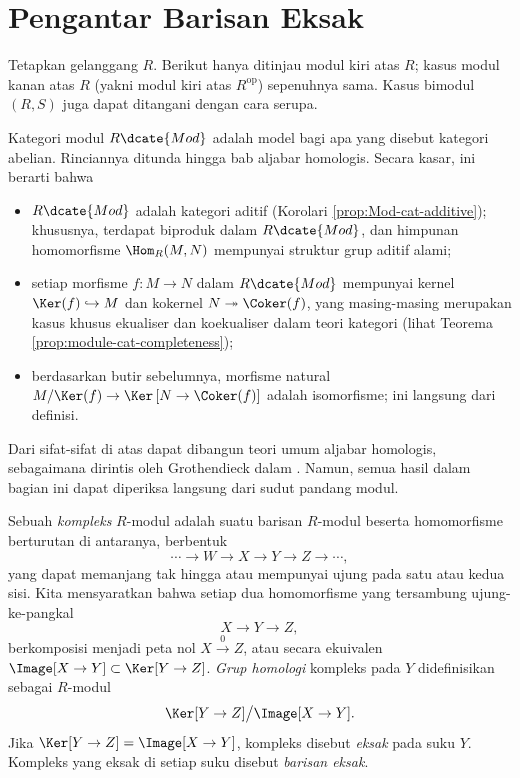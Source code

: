 \section{Pengantar Barisan Eksak}\label{sec:exactseq-module}
Tetapkan gelanggang $R$. Berikut hanya ditinjau modul kiri atas $R$; kasus modul kanan atas $R$ (yakni modul kiri atas $R^\text{op}$) sepenuhnya sama. Kasus bimodul $(R,S)$ juga dapat ditangani dengan cara serupa.

Kategori modul $R\dcate{Mod}$ adalah model bagi apa yang disebut kategori abelian. Rinciannya ditunda hingga bab aljabar homologis. Secara kasar, ini berarti bahwa
\begin{itemize}
	\item $R\dcate{Mod}$ adalah kategori aditif (Korolari \ref{prop:Mod-cat-additive}); khususnya, terdapat biproduk dalam $R\dcate{Mod}$, dan himpunan homomorfisme $\Hom_R(M, N)$ mempunyai struktur grup aditif alami;
	\item setiap morfisme $f: M \to N$ dalam $R\dcate{Mod}$ mempunyai kernel $\Ker(f) \hookrightarrow M$ dan kokernel $N \twoheadrightarrow \Coker(f)$, yang masing-masing merupakan kasus khusus ekualiser dan koekualiser dalam teori kategori (lihat Teorema \ref{prop:module-cat-completeness});
	\item berdasarkan butir sebelumnya, morfisme natural $M/\Ker(f) \to \Ker\left[ N \to \Coker(f) \right]$ adalah isomorfisme; ini langsung dari definisi.
\end{itemize}
Dari sifat-sifat di atas dapat dibangun teori umum aljabar homologis, sebagaimana dirintis oleh Grothendieck dalam \cite{Gr57}. Namun, semua hasil dalam bagian ini dapat diperiksa langsung dari sudut pandang modul.

\begin{definition}
	Sebuah \emph{kompleks} $R$-modul adalah suatu barisan $R$-modul beserta homomorfisme berturutan di antaranya, berbentuk
	\[ \cdots \to W \to X \to Y \to Z \to \cdots, \]
	yang dapat memanjang tak hingga atau mempunyai ujung pada satu atau kedua sisi. Kita mensyaratkan bahwa setiap dua homomorfisme yang tersambung ujung-ke-pangkal
	\[ X \to Y \to Z, \]
	berkomposisi menjadi peta nol $X \xrightarrow{0} Z$, atau secara ekuivalen $\Image[X \to Y] \subset \Ker[Y \to Z]$. \emph{Grup homologi} kompleks pada $Y$ didefinisikan sebagai $R$-modul 
	\[ \Ker[Y \to Z] \big/ \Image[X \to Y]. \]
	Jika $\Ker[Y \to Z] = \Image[X \to Y]$, kompleks disebut \emph{eksak} pada suku $Y$. Kompleks yang eksak di setiap suku disebut \emph{barisan eksak}.
\end{definition}


